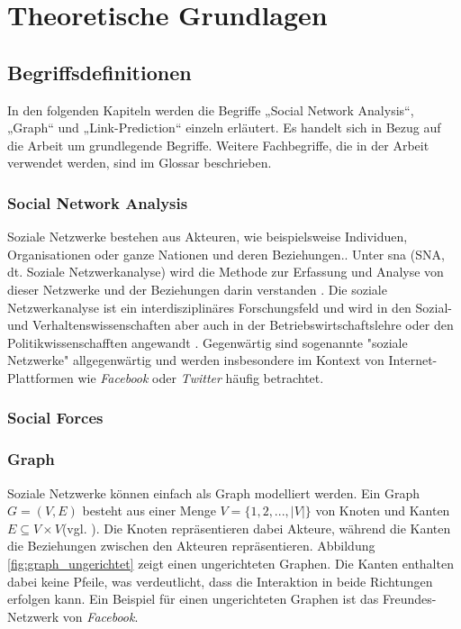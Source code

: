 \chapter{Theoretische Grundlagen}

\section{Begriffsdefinitionen}
In den folgenden Kapiteln werden die Begriffe „Social Network Analysis“, „Graph“ und „Link-Prediction“ einzeln
erläutert. Es handelt sich in Bezug auf die Arbeit um grundlegende Begriffe. Weitere Fachbegriffe, die
in der Arbeit verwendet werden, sind im Glossar beschrieben.

\subsection{Social Network Analysis}
Soziale Netzwerke bestehen aus Akteuren, wie beispielsweise Individuen, Organisationen oder ganze Nationen und deren Beziehungen.\cite{ulrike_baumol_soziale_nodate}.
Unter \acl{sna} (SNA, dt. Soziale Netzwerkanalyse) wird die Methode zur Erfassung und Analyse von dieser Netzwerke und der Beziehungen darin verstanden \cite{noauthor_soziale_2019}.
Die soziale Netzwerkanalyse ist ein interdisziplinäres Forschungsfeld und wird in den Sozial- und Verhaltenswissenschaften aber auch in der Betriebswirtschaftslehre oder den Politikwissenschafften angewandt \cite{ulrike_baumol_soziale_nodate}.
Gegenwärtig sind sogenannte "soziale Netzwerke" allgegenwärtig und werden insbesondere im Kontext von Internet-Plattformen wie \textit{Facebook} oder \textit{Twitter} häufig betrachtet.

\subsection{Social Forces}
\label{socialforces}

\subsection{Graph}
Soziale Netzwerke können einfach als Graph modelliert werden.
Ein Graph $G = (V, E)$ besteht aus einer Menge $V = \{1,2,...,|V|\}$ von Knoten und Kanten $E \subseteq V\times V $(vgl. \cite{ottmann_algorithmen_2017}).
Die Knoten repräsentieren dabei Akteure, während die Kanten die Beziehungen zwischen den Akteuren repräsentieren.
Abbildung \ref{fig:graph_ungerichtet} zeigt einen ungerichteten Graphen. Die Kanten enthalten dabei keine Pfeile, was verdeutlicht, dass die Interaktion in beide Richtungen erfolgen kann.
Ein Beispiel für einen ungerichteten Graphen ist das Freundes-Netzwerk von \textit{Facebook}.

